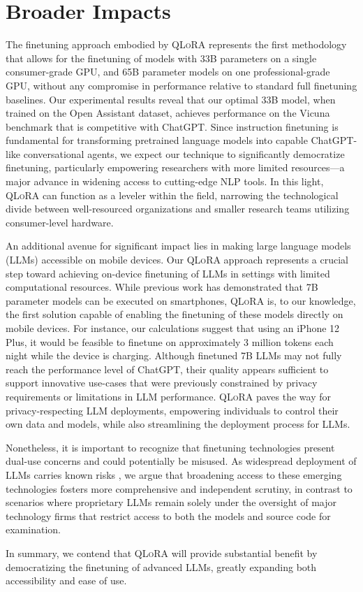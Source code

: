 \section{Broader Impacts}

The finetuning approach embodied by \textsc{QLoRA} represents the first methodology that allows for the finetuning of models with 33B parameters on a single consumer-grade GPU, and 65B parameter models on one professional-grade GPU, without any compromise in performance relative to standard full finetuning baselines. Our experimental results reveal that our optimal 33B model, when trained on the Open Assistant dataset, achieves performance on the Vicuna benchmark that is competitive with ChatGPT. Since instruction finetuning is fundamental for transforming pretrained language models into capable ChatGPT-like conversational agents, we expect our technique to significantly democratize finetuning, particularly empowering researchers with more limited resources—a major advance in widening access to cutting-edge NLP tools. In this light, \textsc{QLoRA} can function as a leveler within the field, narrowing the technological divide between well-resourced organizations and smaller research teams utilizing consumer-level hardware.

An additional avenue for significant impact lies in making large language models (LLMs) accessible on mobile devices. Our \textsc{QLoRA} approach represents a crucial step toward achieving on-device finetuning of LLMs in settings with limited computational resources. While previous work has demonstrated that 7B parameter models can be executed on smartphones, \textsc{QLoRA} is, to our knowledge, the first solution capable of enabling the finetuning of these models directly on mobile devices. For instance, our calculations suggest that using an iPhone 12 Plus, it would be feasible to finetune on approximately 3 million tokens each night while the device is charging. Although finetuned 7B LLMs may not fully reach the performance level of ChatGPT, their quality appears sufficient to support innovative use-cases that were previously constrained by privacy requirements or limitations in LLM performance. \textsc{QLoRA} paves the way for privacy-respecting LLM deployments, empowering individuals to control their own data and models, while also streamlining the deployment process for LLMs.

Nonetheless, it is important to recognize that finetuning technologies present dual-use concerns and could potentially be misused. As widespread deployment of LLMs carries known risks \citep{bommasani2021opportunities,bender2021dangers}, we argue that broadening access to these emerging technologies fosters more comprehensive and independent scrutiny, in contrast to scenarios where proprietary LLMs remain solely under the oversight of major technology firms that restrict access to both the models and source code for examination.

In summary, we contend that \textsc{QLoRA} will provide substantial benefit by democratizing the finetuning of advanced LLMs, greatly expanding both accessibility and ease of use.